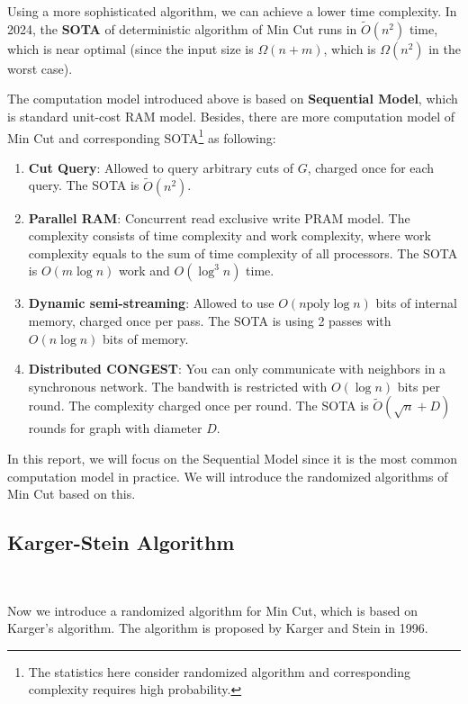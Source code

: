 \documentclass[11pt]{article}
\theoremstyle{plain}
\begin{document}
Using a more sophisticated algorithm, we can achieve a lower time complexity. In 2024, the \textbf{SOTA}\cite{doi:10.1137/1.9781611977912.111} of deterministic algorithm of Min Cut runs in $\tilde{O}(n^2)$ time, which is near optimal (since the input size is $\Omega(n+m)$, which is $\Omega(n^2)$ in the worst case).

The computation model introduced above is based on \textbf{Sequential Model}, which is standard unit-cost RAM model. Besides, there are more computation model of Min Cut and corresponding SOTA\footnote{The statistics here consider randomized algorithm and corresponding complexity requires high probability.} as following:
\begin{enumerate}
    \item \textbf{Cut Query}: Allowed to query arbitrary cuts of $G$, charged once for each query. The SOTA is $\tilde{O}(n^2)$\cite{mukhopadhyay2020weighted}.
    \item \textbf{Parallel RAM}: Concurrent read exclusive write PRAM model. The complexity consists of time complexity and work complexity, where work complexity equals to the sum of time complexity of all processors. The SOTA is $O(m\log n)$ work and $O(\log^3 n)$ time\cite{anderson2023parallel}.
    \item \textbf{Dynamic semi-streaming}: Allowed to use $O(n\text{poly}\log n)$ bits of internal memory, charged once per pass. The SOTA is using 2 passes with $O(n\log n)$ bits of memory\cite{assadi2021simple}.
    \item \textbf{Distributed CONGEST}: You can only communicate with neighbors in a synchronous network. The bandwith is restricted with $O(\log n)$ bits per round. The complexity charged once per round. The SOTA is $\tilde{O}(\sqrt{n}+D)$ rounds for graph with diameter $D$\cite{dory2021distributed}.
\end{enumerate}

In this report, we will focus on the Sequential Model since it is the most common computation model in practice. We will introduce the randomized algorithms of Min Cut based on this.

\subsection{Karger-Stein Algorithm}\

Now we introduce a randomized algorithm for Min Cut, which is based on Karger's algorithm\cite{inproceedings}. The algorithm is proposed by Karger and Stein in 1996\cite{karger1996new}.
\end{document}
